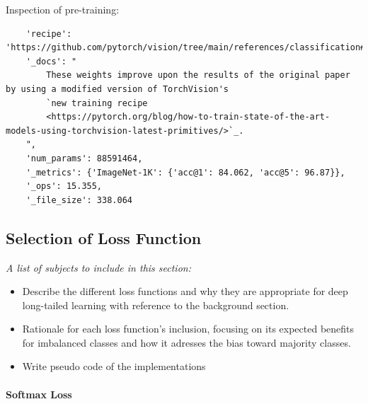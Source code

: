 Inspection of pre-training:
\begin{verbatim}
    'recipe': 'https://github.com/pytorch/vision/tree/main/references/classification#convnext', 
    '_docs': "
        These weights improve upon the results of the original paper by using a modified version of TorchVision's
        `new training recipe
        <https://pytorch.org/blog/how-to-train-state-of-the-art-models-using-torchvision-latest-primitives/>`_.
    ", 
    'num_params': 88591464, 
    '_metrics': {'ImageNet-1K': {'acc@1': 84.062, 'acc@5': 96.87}}, 
    '_ops': 15.355, 
    '_file_size': 338.064
\end{verbatim}
    

\subsection{Selection of Loss Function}
\label{sec:loss_selection}
\textit{A list of subjects to include in this section:}

 \begin{itemize}
    \item Describe the different loss functions and why they are appropriate for deep long-tailed learning with reference to the background section.
    \item Rationale for each loss function's inclusion, focusing on its expected benefits for imbalanced classes and how it adresses the bias toward majority classes.
    \item Write pseudo code of the implementations
 \end{itemize}

 

 \paragraph{Softmax Loss}

